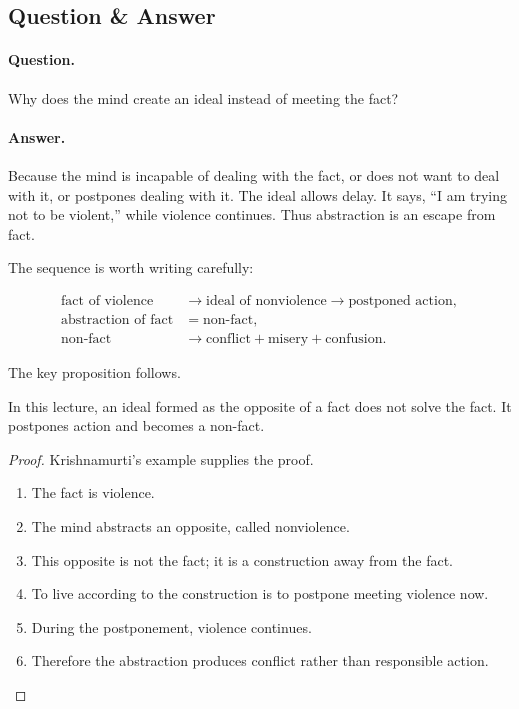 \subsection{Question \& Answer}

\paragraph{Question.}
Why does the mind create an ideal instead of meeting the fact?

\paragraph{Answer.}
Because the mind is incapable of dealing with the fact, or does not want to deal with it, or postpones dealing with it. The ideal allows delay. It says, ``I am trying not to be violent,'' while violence continues. Thus abstraction is an escape from fact.

The sequence is worth writing carefully:

\begin{align}
\text{fact of violence}
&\longrightarrow \text{ideal of nonviolence}
\longrightarrow \text{postponed action}, \\
\text{abstraction of fact}
&= \text{non-fact}, \\
\text{non-fact}
&\longrightarrow \text{conflict}+\text{misery}+\text{confusion}.
\end{align}

The key proposition follows.

\begin{proposition}
In this lecture, an ideal formed as the opposite of a fact does not solve the fact. It postpones action and becomes a non-fact.
\end{proposition}

\begin{proof}
Krishnamurti's example supplies the proof.
\begin{enumerate}
\item The fact is violence.
\item The mind abstracts an opposite, called nonviolence.
\item This opposite is not the fact; it is a construction away from the fact.
\item To live according to the construction is to postpone meeting violence now.
\item During the postponement, violence continues.
\item Therefore the abstraction produces conflict rather than responsible action.
\end{enumerate}
\end{proof}

